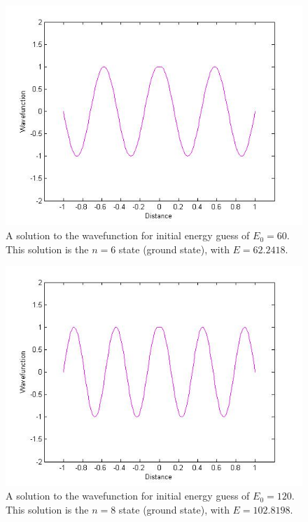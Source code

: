 \documentclass[12pt]{article}                  %
\begin{document}
\begin{figure}[H]
\centering
\includegraphics[scale=0.45]{aogle_final_n_6.jpg}
\caption{A solution to the wavefunction for initial energy guess of $E_{0} = 60$. This solution is the $n = 6$ state (ground state), with $E = 62.2418$.}
\label{wavefunction n = 6}
\end{figure}

\begin{figure}[H]
\centering
\includegraphics[scale=0.45]{aogle_final_n_8.jpg}
\caption{A solution to the wavefunction for initial energy guess of $E_{0} = 120$. This solution is the $n = 8$ state (ground state), with $E = 102.8198$.}
\label{wavefunction n = 8}
\end{figure}
\end{document}
